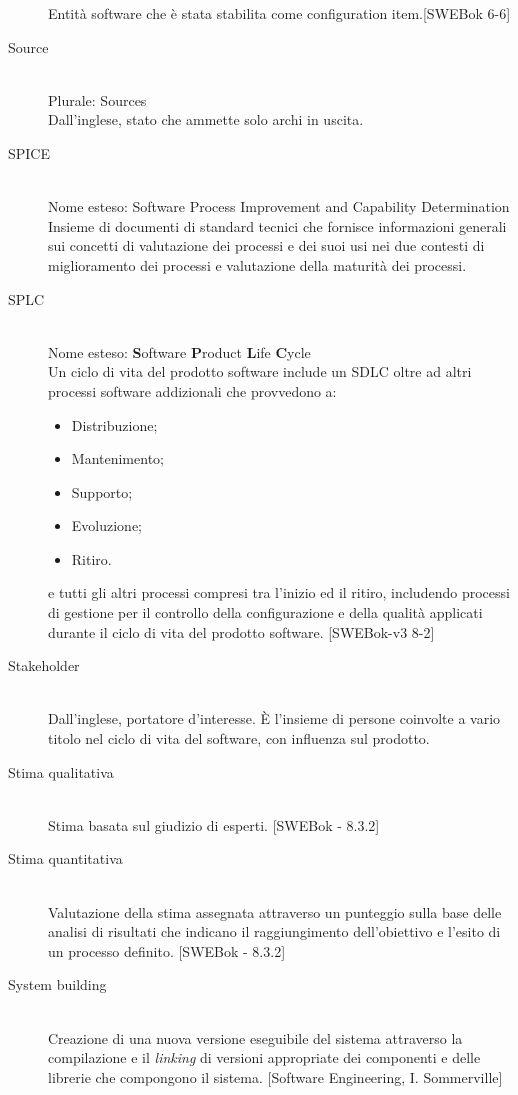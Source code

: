 \begin{description}
Entità software che è stata stabilita come configuration item.[SWEBok 6-6]
 \item[Source] \hfill \\
Plurale: Sources\\ 
Dall'inglese, stato che ammette solo archi in uscita.
 \item[SPICE] \hfill \\
Nome esteso: Software Process Improvement and Capability Determination\\ 
Insieme di documenti di standard tecnici che fornisce informazioni generali sui concetti di valutazione dei processi e dei suoi usi nei due contesti di miglioramento dei processi e valutazione della maturità dei processi.
 \item[SPLC] \hfill \\
Nome esteso: \textbf{S}oftware \textbf{P}roduct \textbf{L}ife \textbf{C}ycle\\ 
Un ciclo di vita del prodotto software include un SDLC oltre ad altri processi software addizionali che provvedono a: \begin{itemize}
\item Distribuzione;
\item Mantenimento;
\item Supporto;
\item Evoluzione;
\item Ritiro.
\end{itemize}
e tutti gli altri processi compresi tra l'inizio ed il ritiro, includendo
processi di gestione per il controllo della configurazione e della qualità applicati durante il ciclo di vita del prodotto software. [SWEBok-v3 8-2]
 \item[Stakeholder] \hfill \\
Dall'inglese, portatore d'interesse. È l'insieme di persone coinvolte a vario titolo nel ciclo di vita del software, con influenza sul prodotto.
 \item[Stima qualitativa] \hfill \\
Stima basata sul giudizio di esperti. [SWEBok - 8.3.2]
 \item[Stima quantitativa] \hfill \\
Valutazione della stima assegnata attraverso un punteggio sulla	base delle analisi di risultati che indicano il raggiungimento dell'obiettivo e l'esito di un processo definito. [SWEBok - 8.3.2]
 \item[System building] \hfill \\
Creazione di una nuova versione eseguibile del sistema attraverso la compilazione e il \textit{linking} di versioni appropriate dei componenti e delle librerie che compongono il sistema. [Software Engineering, I. Sommerville]
 \end{description}
